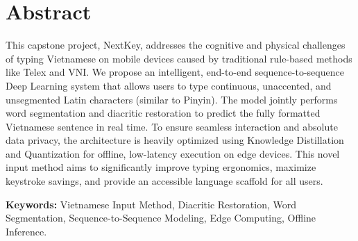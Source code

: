 
\chapter*{Abstract}

This capstone project, NextKey, addresses the cognitive and physical challenges of typing Vietnamese on mobile devices caused by traditional rule-based methods like Telex and VNI. We propose an intelligent, end-to-end sequence-to-sequence Deep Learning system that allows users to type continuous, unaccented, and unsegmented Latin characters (similar to Pinyin). The model jointly performs word segmentation and diacritic restoration to predict the fully formatted Vietnamese sentence in real time. To ensure seamless interaction and absolute data privacy, the architecture is heavily optimized using Knowledge Distillation and Quantization for offline, low-latency execution on edge devices. This novel input method aims to significantly improve typing ergonomics, maximize keystroke savings, and provide an accessible language scaffold for all users.

\vspace{0.5cm}
\textbf{Keywords:} Vietnamese Input Method, Diacritic Restoration, Word Segmentation, Sequence-to-Sequence Modeling, Edge Computing, Offline Inference.
